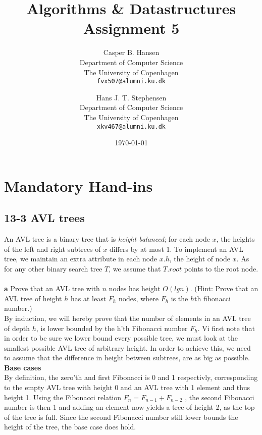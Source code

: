 \documentclass[11pt,english]{article}
\title
{
	\vspace{1in}
	Algorithms \& Datastructures\\
	\huge Assignment 5
}
\author
{
	Casper B. Hansen\\
	\small Department of Computer Science\\
	\small The University of Copenhagen\\
	\texttt{fvx507@alumni.ku.dk}
	\and
	Hans J. T. Stephensen\\
	\small Department of Computer Science\\
	\small The University of Copenhagen\\
	\texttt{xkv467@alumni.ku.dk}
}
\date{\today}
\begin{document}
\clearpage
\maketitle
\thispagestyle{empty}


\newpage
\pagestyle{fancy}

\section*{Mandatory Hand-ins}

\subsection*{13-3 AVL trees}
\large{An AVL tree is a binary tree that is \textit{height balanced}; for each
node $x$, the heights of the left and right subtrees of $x$ differs by at most
1. To implement an AVL tree, we maintain an extra attribute in each node $x.h$,
the height of node $x$. As for any other binary search tree $T$, we assume
that $T.root$ points to the root node.}
\\\\
\noindent \large{\textbf{a} \mdseries Prove that an AVL tree with $n$ nodes
has height $O(lg n)$. (Hint: Prove that an AVL tree of height $h$ has at
least $F_h$ nodes, where $F_h$ is the $h$th fibonacci number.)}
\\
By induction, we will hereby prove that the number of elements in an AVL tree of 
depth $h$, is lower bounded by the h'th Fibonacci number $F_h$. Vi first note 
that in order to be sure we lower bound every possible tree, we must look at 
the smallest possible AVL tree of arbitrary height. In order to achieve this,
we need to assume that the difference in height between subtrees, are as big
as possible.\\[5pt]

\noindent \textbf{Base cases} \\[5pt]
By definition, the zero'th and first Fibonacci is 0 and 1 respectivly, 
corresponding to the empty AVL tree with height 0 and an AVL tree with 1 
element and thus height 1. Using the Fibonacci relation $F_n = F_{n-1} + F_{n-2}$
, the second Fibonacci number is then 1 and adding an element now yields a tree 
of height 2, as the top of the tree is full. Since the second Fibonacci number 
still lower bounds the height of the tree, the base case does hold.\\[5pt]
\end{document}
